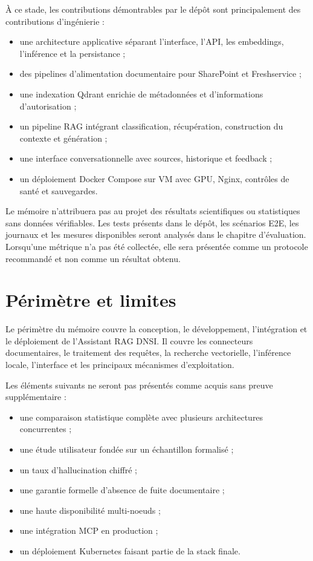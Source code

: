 À ce stade, les contributions démontrables par le dépôt sont principalement des contributions d'ingénierie :

\begin{itemize}
    \item une architecture applicative séparant l'interface, l'API, les embeddings, l'inférence et la persistance ;
    \item des pipelines d'alimentation documentaire pour SharePoint et Freshservice ;
    \item une indexation Qdrant enrichie de métadonnées et d'informations d'autorisation ;
    \item un pipeline RAG intégrant classification, récupération, construction du contexte et génération ;
    \item une interface conversationnelle avec sources, historique et feedback ;
    \item un déploiement Docker Compose sur VM avec GPU, Nginx, contrôles de santé et sauvegardes.
\end{itemize}

Le mémoire n'attribuera pas au projet des résultats scientifiques ou statistiques sans données vérifiables. Les tests présents dans le dépôt, les scénarios E2E, les journaux et les mesures disponibles seront analysés dans le chapitre d'évaluation. Lorsqu'une métrique n'a pas été collectée, elle sera présentée comme un protocole recommandé et non comme un résultat obtenu.

\section{Périmètre et limites}

Le périmètre du mémoire couvre la conception, le développement, l'intégration et le déploiement de l'Assistant RAG DNSI. Il couvre les connecteurs documentaires, le traitement des requêtes, la recherche vectorielle, l'inférence locale, l'interface et les principaux mécanismes d'exploitation.

Les éléments suivants ne seront pas présentés comme acquis sans preuve supplémentaire :

\begin{itemize}
    \item une comparaison statistique complète avec plusieurs architectures concurrentes ;
    \item une étude utilisateur fondée sur un échantillon formalisé ;
    \item un taux d'hallucination chiffré ;
    \item une garantie formelle d'absence de fuite documentaire ;
    \item une haute disponibilité multi-noeuds ;
    \item une intégration MCP en production ;
    \item un déploiement Kubernetes faisant partie de la stack finale.
\end{itemize}

